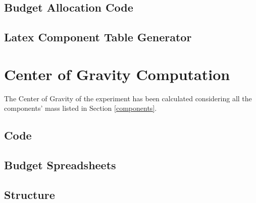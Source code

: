 \documentclass[a4paper,12pt,oneside]{article}
\begin{document}
\begin{appendices}
\subsection{Budget Allocation Code}



\newpage
\subsection{Latex Component Table Generator}



\newpage


\newpage
\section{Center of Gravity Computation}



The Center of Gravity of the experiment has been calculated considering all the components' mass listed in Section \ref{components}.


\subsection{Code}












\begin{landscape}
\section{Budget Spreadsheets}
\label{sec:appO}

\subsection{Structure}



\end{landscape}
\end{appendices}
\end{document}
